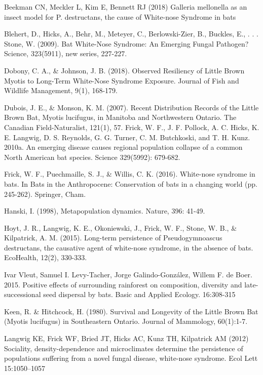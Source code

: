 \documentclass[12pt]{article}
\begin{document}
\hangindent=0.5cm Beekman CN, Meckler L, Kim E, Bennett RJ (2018) Galleria mellonella as an insect model for P. destructans, the cause of White-nose Syndrome in bats
 
\hangindent=0.5cm Blehert, D., Hicks, A., Behr, M., Meteyer, C., Berlowski-Zier, B., Buckles, E., . . . Stone, W. (2009). Bat White-Nose Syndrome: An Emerging Fungal Pathogen? Science, 323(5911), new series, 227-227.
 
\hangindent=0.5cm Dobony, C. A., \& Johnson, J. B. (2018). Observed Resiliency of Little Brown Myotis to Long-Term White-Nose Syndrome Exposure. Journal of Fish and Wildlife Management, 9(1), 168-179.
 
\hangindent=0.5cm Dubois, J. E., \& Monson, K. M. (2007). Recent Distribution Records of the Little Brown Bat, Myotis lucifugus, in Manitoba and Northwestern Ontario. The Canadian Field-Naturalist, 121(1), 57.
\hangindent=0.5cm Frick, W. F., J. F. Pollock, A. C. Hicks, K. E. Langwig, D. S. Reynolds, G. G. Turner, C. M. Butchkoski, and T. H. Kunz. 2010a. An emerging disease causes regional population collapse of a common North American bat species. Science 329(5992): 679-682.

\hangindent=0.5cm Frick, W. F., Puechmaille, S. J., \& Willis, C. K. (2016). White-nose syndrome in bats. In Bats in the Anthropocene: Conservation of bats in a changing world (pp. 245-262). Springer, Cham.
 
\hangindent=0.5cm Hanski, I. (1998), Metapopulation dynamics. Nature, 396: 41-49.
 
\hangindent=0.5cm Hoyt, J. R., Langwig, K. E., Okoniewski, J., Frick, W. F., Stone, W. B., \& Kilpatrick, A. M. (2015). Long-term persistence of Pseudogymnoascus destructans, the causative agent of white-nose syndrome, in the absence of bats. EcoHealth, 12(2), 330-333.
 
\hangindent=0.5cm Ivar Vleut, Samuel I. Levy-Tacher, Jorge Galindo-González, Willem F. de Boer. 2015. Positive effects of surrounding rainforest on composition, diversity and late-successional seed dispersal by bats. Basic and Applied Ecology. 16:308-315

\hangindent=0.5cm Keen, R. & Hitchcock, H. (1980). Survival and Longevity of the Little Brown Bat (Myotis lucifugus) in Southeastern Ontario. Journal of Mammology, 60(1):1-7.


\hangindent=0.5cm Langwig KE, Frick WF, Bried JT, Hicks AC, Kunz TH, Kilpatrick AM (2012) Sociality, density-dependence and microclimates determine the persistence of populations suffering from a novel fungal disease, white-nose syndrome. Ecol Lett 15:1050–1057
 
\end{document}
